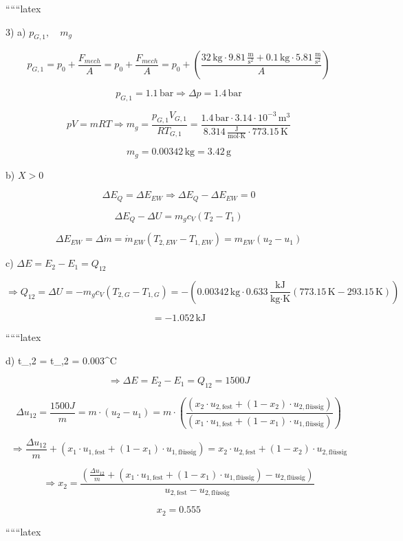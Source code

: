 
``````latex


3) a) $p_{G,1}, \quad m_g$

\[
p_{G,1} = p_0 + \frac{F_{mech}}{A} = p_0 + \frac{F_{mech}}{A} = p_0 + \left( \frac{32 \, \text{kg} \cdot 9.81 \, \frac{\text{m}}{\text{s}^2} + 0.1 \, \text{kg} \cdot 5.81 \, \frac{\text{m}}{\text{s}^2}}{A} \right)
\]

\[
p_{G,1} = 1.1 \, \text{bar} \Rightarrow \Delta p = 1.4 \, \text{bar}
\]

\[
pV = mRT \Rightarrow m_g = \frac{p_{G,1} V_{G,1}}{R T_{G,1}} = \frac{1.4 \, \text{bar} \cdot 3.14 \cdot 10^{-3} \, \text{m}^3}{8.314 \, \frac{\text{J}}{\text{mol} \cdot \text{K}} \cdot 773.15 \, \text{K}}
\]

\[
m_g = 0.00342 \, \text{kg} = 3.42 \, \text{g}
\]

b) $X > 0$

\[
\Delta E_Q = \Delta E_{EW} \Rightarrow \Delta E_Q - \Delta E_{EW} = 0
\]

\[
\Delta E_Q - \Delta U = m_g c_V (T_2 - T_1)
\]

\[
\Delta E_{EW} = \Delta \dot{m} = \dot{m}_{EW} (T_{2,EW} - T_{1,EW}) = m_{EW} (u_2 - u_1)
\]

c) $\Delta E = E_2 - E_1 = Q_{12}$

\[
\Rightarrow Q_{12} = \Delta U = -m_g c_V (T_{2,G} - T_{1,G}) = -(0.00342 \, \text{kg} \cdot 0.633 \, \frac{\text{kJ}}{\text{kg} \cdot \text{K}} (773.15 \, \text{K} - 293.15 \, \text{K}))
\]

\[
= -1.052 \, \text{kJ}
\]

``````latex

d) \quad t_{,2} = t_{,2} = 0.003^\circ C

\[
\Rightarrow \Delta E = E_2 - E_1 = Q_{12} = 1500 J
\]

\[
\Delta u_{12} = \frac{1500 J}{m} = m \cdot (u_2 - u_1) = m \cdot \left( \frac{(x_2 \cdot u_{2,\text{fest}} + (1 - x_2) \cdot u_{2,\text{flüssig}})}{(x_1 \cdot u_{1,\text{fest}} + (1 - x_1) \cdot u_{1,\text{flüssig}})} \right)
\]

\[
\Rightarrow \frac{\Delta u_{12}}{m} + (x_1 \cdot u_{1,\text{fest}} + (1 - x_1) \cdot u_{1,\text{flüssig}}) = x_2 \cdot u_{2,\text{fest}} + (1 - x_2) \cdot u_{2,\text{flüssig}}
\]

\[
\Rightarrow x_2 = \frac{\left( \frac{\Delta u_{12}}{m} + (x_1 \cdot u_{1,\text{fest}} + (1 - x_1) \cdot u_{1,\text{flüssig}}) - u_{2,\text{flüssig}} \right)}{u_{2,\text{fest}} - u_{2,\text{flüssig}}}
\]

\[
x_2 = 0.555
\]

``````latex


